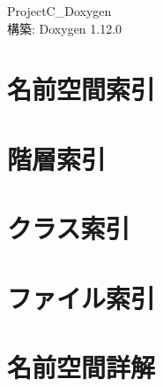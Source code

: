 \documentclass[twoside]{book}
\newcommand{\+}{\discretionary{\mbox{\scriptsize$\hookleftarrow$}}{}{}}
\newcommand{\clearemptydoublepage}{%
    \newpage{\pagestyle{empty}\cleardoublepage}%
  }
\begin{document}
  \raggedbottom
  \begin{CJK}{UTF8}{min}
    \hypersetup{pageanchor=false,
                bookmarksnumbered=true,
                pdfencoding=unicode
               }
  \begin{titlepage}
  \vspace*{7cm}
  \begin{center}%
  {\Large Project\+C\+\_\+\+Doxygen}\\
  \vspace*{1cm}
  {\large 構築\+: Doxygen 1.12.0}\\
  \end{center}
  \end{titlepage}
  \clearemptydoublepage
  \tableofcontents
  \clearemptydoublepage
  \hypersetup{pageanchor=true}
\chapter{名前空間索引}

\chapter{階層索引}

\chapter{クラス索引}

\chapter{ファイル索引}

\chapter{名前空間詳解}




















\end{CJK}
\end{document}
